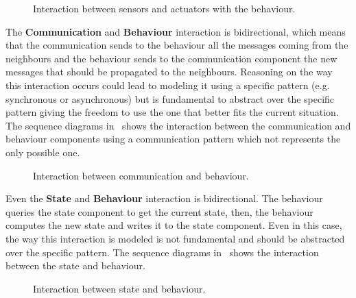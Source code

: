\begin{figure}
	\centering
	\caption{Interaction between sensors and actuators with the behaviour.}
	\label{fig:framework-components-interaction-2-sensors-actuators}
\end{figure}

The \textbf{Communication} and \textbf{Behaviour} interaction is bidirectional, which means that the communication sends to the behaviour all the
messages coming from the neighbours and the behaviour sends to the communication component the new messages that should be propagated
to the neighbours.
Reasoning on the way this interaction occurs could lead to modeling it using a specific pattern (e.g. synchronous or asynchronous) but is fundamental
to abstract over the specific pattern giving the freedom to use the one that better fits the current situation.
The sequence diagrams in~ shows the interaction between the communication and
behaviour components using a communication pattern which not represents the only possible one.

\begin{figure}
	\centering
	\caption{Interaction between communication and behaviour.}
	\label{fig:framework-components-interaction-2-communication-behaviour}
\end{figure}

Even the \textbf{State} and \textbf{Behaviour} interaction is bidirectional.
The behaviour queries the state component to get the current state, then, the behaviour computes the new state and writes it to the state component.
Even in this case, the way this interaction is modeled is not fundamental and should be abstracted over the specific pattern.
The sequence diagrams in~ shows the interaction between the state and behaviour.

\begin{figure}
	\centering
	\caption{Interaction between state and behaviour.}
	\label{fig:framework-components-interaction-2-state-behaviour}
\end{figure}

